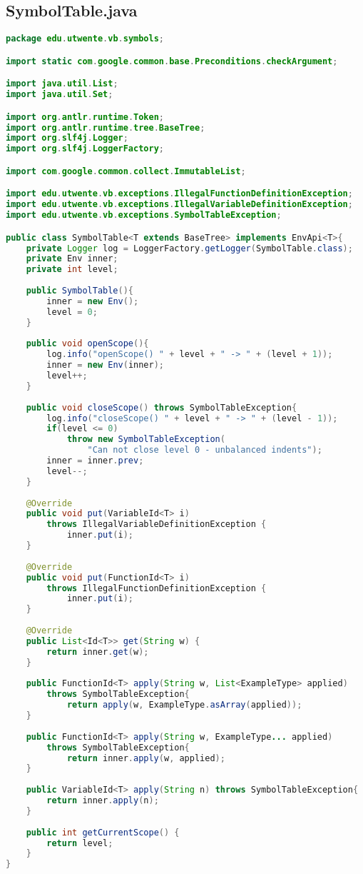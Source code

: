 \subsection{SymbolTable.java}
\begin{lstlisting}[language=Java]
package edu.utwente.vb.symbols;

import static com.google.common.base.Preconditions.checkArgument;

import java.util.List;
import java.util.Set;

import org.antlr.runtime.Token;
import org.antlr.runtime.tree.BaseTree;
import org.slf4j.Logger;
import org.slf4j.LoggerFactory;

import com.google.common.collect.ImmutableList;

import edu.utwente.vb.exceptions.IllegalFunctionDefinitionException;
import edu.utwente.vb.exceptions.IllegalVariableDefinitionException;
import edu.utwente.vb.exceptions.SymbolTableException;

public class SymbolTable<T extends BaseTree> implements EnvApi<T>{
	private Logger log = LoggerFactory.getLogger(SymbolTable.class);
	private Env inner;
	private int level;
	
	public SymbolTable(){
		inner = new Env();
		level = 0;
	}
	
	public void openScope(){
		log.info("openScope() " + level + " -> " + (level + 1));
		inner = new Env(inner);		
		level++;
	}
	
	public void closeScope() throws SymbolTableException{
		log.info("closeScope() " + level + " -> " + (level - 1));
		if(level <= 0)
			throw new SymbolTableException(
                "Can not close level 0 - unbalanced indents");
		inner = inner.prev;
		level--;
	}
	
	@Override
	public void put(VariableId<T> i) 
        throws IllegalVariableDefinitionException {
    		inner.put(i);
	}
	
	@Override
	public void put(FunctionId<T> i) 
        throws IllegalFunctionDefinitionException {
    		inner.put(i);
	}
	
	@Override
	public List<Id<T>> get(String w) {
		return inner.get(w);
	}
	
	public FunctionId<T> apply(String w, List<ExampleType> applied) 
        throws SymbolTableException{
    		return apply(w, ExampleType.asArray(applied));
	}
	
	public FunctionId<T> apply(String w, ExampleType... applied) 
        throws SymbolTableException{
    		return inner.apply(w, applied);
	}
	
	public VariableId<T> apply(String n) throws SymbolTableException{
		return inner.apply(n);
	}
	
	public int getCurrentScope() {
		return level;
	}
}
\end{lstlisting}
